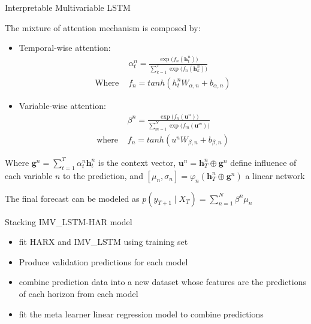 \begin{frame}{Interpretable Multivariable LSTM}

The mixture of attention mechanism is composed by:
\begin{itemize}
  \item Temporal-wise attention:
  \begin{equation*}
  \begin{aligned}
    &\alpha^n_t = \frac{\exp\big(f_n(\mathbf{h}^n_t)\big)}{\sum_{k=1}^T \exp\big(f_n(\mathbf{h}^n_k)\big)}\\
    \text{Where } & f_n = tanh(h^n_t W_{\alpha,n} + b_{\alpha,n})
  \end{aligned}
\end{equation*}

  \item Variable-wise attention:
    \begin{equation*}
  \begin{aligned}
    &\beta^n = \frac{\exp\big(f_n(\mathbf{u}^n)\big)}{\sum_{m=1}^N \exp\big(f_m(\mathbf{u}^m)\big)}\\
    \text{where } &f_n = tanh(u^n W_{\beta,n} + b_{\beta,n})
  \end{aligned}
\end{equation*}  
\end{itemize}
Where $\mathbf{g}^n = \sum_{t=1}^T \alpha^n_t \mathbf{h}^n_t$ is the context vector,
$\mathbf{u}^n = \mathbf{h}^n_T \oplus \mathbf{g}^n$ define influence of each variable $n$ to the prediction, and 
$[\mu_n, \sigma_n]=\varphi_n(\mathbf{h}_T^n \oplus \mathbf{g}^n)$ a linear network
 
\vspace{3mm}

The final forecast can be modeled as $p(y_{T+1} \mid X_T) = \sum_{n=1}^N \beta^n \mu_n$\\


\end{frame}


\begin{frame}{Stacking IMV\_LSTM-HAR model}
  



\begin{itemize}
  \item fit HARX and IMV\_LSTM using training set
  \item Produce validation predictions for each model
  \item combine prediction data into a new dataset whose features are the predictions of each horizon from each model
  \item fit the meta learner linear regression model to combine predictions
\end{itemize}


\end{frame}


